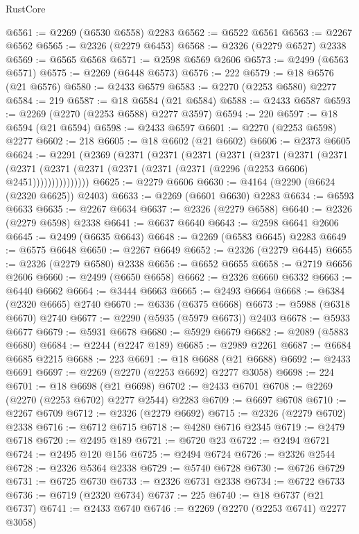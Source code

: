 \begin{lexlean}{RustCore}
\begin{coremodule}
@6561 := @2269 (@6530 @6558) @2283
@6562 := @6522 @6561
@6563 := @2267 @6562
@6565 := @2326 (@2279 @6453)
@6568 := @2326 (@2279 @6527) @2338
@6569 := @6565 @6568
@6571 := @2598 @6569 @2606
@6573 := @2499 (@6563 @6571)
@6575 := @2269 (@6448 @6573)
@6576 := 222
@6579 := @18 @6576 (@21 @6576)
@6580 := @2433 @6579
@6583 := @2270 (@2253 @6580) @2277
@6584 := 219
@6587 := @18 @6584 (@21 @6584)
@6588 := @2433 @6587
@6593 := @2269 (@2270 (@2253 @6588) @2277 @3597)
@6594 := 220
@6597 := @18 @6594 (@21 @6594)
@6598 := @2433 @6597
@6601 := @2270 (@2253 @6598) @2277
@6602 := 218
@6605 := @18 @6602 (@21 @6602)
@6606 := @2373 @6605
@6624 := @2291
    (@2369
      (@2371
        (@2371
          (@2371
            (@2371
              (@2371
                (@2371
                  (@2371
                    (@2371
                      (@2371 (@2371 (@2371 (@2371 (@2371 (@2296 (@2253 @6606) @2451)))))))))))))))
@6625 := @2279 @6606
@6630 := @4164 (@2290 (@6624 (@2320 @6625)) @2403)
@6633 := @2269 (@6601 @6630) @2283
@6634 := @6593 @6633
@6635 := @2267 @6634
@6637 := @2326 (@2279 @6588)
@6640 := @2326 (@2279 @6598) @2338
@6641 := @6637 @6640
@6643 := @2598 @6641 @2606
@6645 := @2499 (@6635 @6643)
@6648 := @2269 (@6583 @6645) @2283
@6649 := @6575 @6648
@6650 := @2267 @6649
@6652 := @2326 (@2279 @6445)
@6655 := @2326 (@2279 @6580) @2338
@6656 := @6652 @6655
@6658 := @2719 @6656 @2606
@6660 := @2499 (@6650 @6658)
@6662 := @2326 @6660 @6332
@6663 := @6440 @6662
@6664 := @3444 @6663
@6665 := @2493 @6664
@6668 := @6384 (@2320 @6665) @2740
@6670 := @6336 (@6375 @6668)
@6673 := @5988 (@6318 @6670) @2740
@6677 := @2290 (@5935 (@5979 @6673)) @2403
@6678 := @5933 @6677
@6679 := @5931 @6678
@6680 := @5929 @6679
@6682 := @2089 (@5883 @6680)
@6684 := @2244 (@2247 @189)
@6685 := @2989 @2261
@6687 := @6684 @6685 @2215
@6688 := 223
@6691 := @18 @6688 (@21 @6688)
@6692 := @2433 @6691
@6697 := @2269 (@2270 (@2253 @6692) @2277 @3058)
@6698 := 224
@6701 := @18 @6698 (@21 @6698)
@6702 := @2433 @6701
@6708 := @2269 (@2270 (@2253 @6702) @2277 @2544) @2283
@6709 := @6697 @6708
@6710 := @2267 @6709
@6712 := @2326 (@2279 @6692)
@6715 := @2326 (@2279 @6702) @2338
@6716 := @6712 @6715
@6718 := @4280 @6716 @2345
@6719 := @2479 @6718
@6720 := @2495 @189
@6721 := @6720 @23
@6722 := @2494 @6721
@6724 := @2495 @120 @156
@6725 := @2494 @6724
@6726 := @2326 @2544
@6728 := @2326 @5364 @2338
@6729 := @5740 @6728
@6730 := @6726 @6729
@6731 := @6725 @6730
@6733 := @2326 @6731 @2338
@6734 := @6722 @6733
@6736 := @6719 (@2320 @6734)
@6737 := 225
@6740 := @18 @6737 (@21 @6737)
@6741 := @2433 @6740
@6746 := @2269 (@2270 (@2253 @6741) @2277 @3058)

\end{coremodule}
\end{lexlean}
